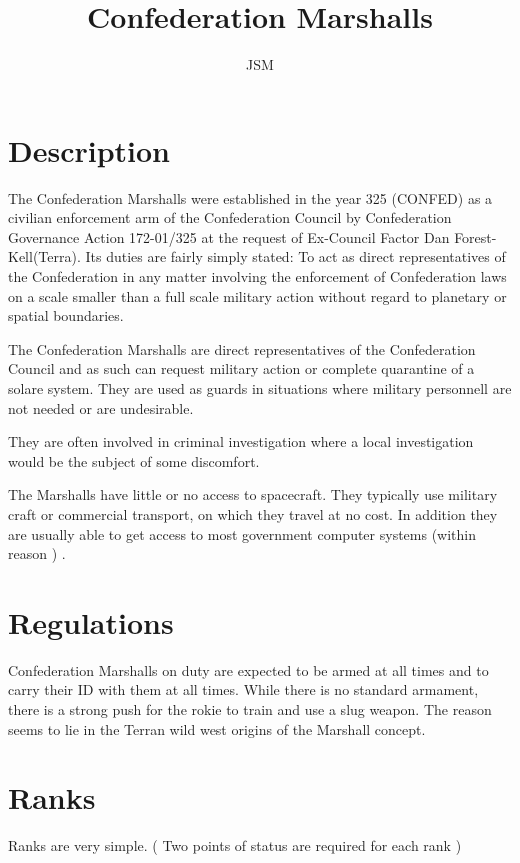 
\title{Confederation Marshalls}
\author{JSM}
\maketitle
\section{Description}

The Confederation Marshalls were established in the year 325 (CONFED) 
as a civilian enforcement arm of the Confederation Council by 
Confederation Governance Action 172-01/325 at the request of 
Ex-Council Factor Dan Forest-Kell(Terra). Its duties are fairly 
simply stated: To act as direct representatives of the Confederation 
in any matter involving the enforcement of Confederation laws on a
scale smaller than a full scale military action without regard to 
planetary or spatial boundaries.  

The Confederation Marshalls are direct representatives of the 
Confederation Council and as such can request military action or 
complete quarantine of a solare system. They are used as guards in 
situations where military personnell are not needed or are 
undesirable.

They are often involved in criminal investigation where a local 
investigation would be the subject of some discomfort.

The Marshalls have little or no access to spacecraft. They typically 
use military craft or commercial transport, on which they travel at 
no cost. In addition they are usually able to get access to most 
government computer systems (within reason ) .

\section{Regulations}

Confederation Marshalls on duty are expected to be armed at all times 
and to carry their ID with them at all times. While there is no 
standard armament, there is a strong push for the rokie to train and 
use a slug weapon. The reason seems to lie in the Terran wild west 
origins of the Marshall concept. 

\section{Ranks}

Ranks are very simple. ( Two points of status are required for each rank )

